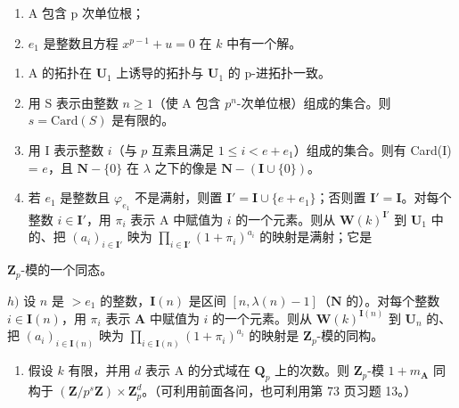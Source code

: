 \begin{enumerate}
\def\labelenumi{(\roman{enumi})}
\item
  A 包含 p 次单位根；
\item
  \(e_1\) 是整数且方程 \(x^{p - 1} + u = 0\) 在 \(k\) 中有一个解。
\end{enumerate}

\begin{enumerate}
\def\labelenumi{\alph{enumi})}
\setcounter{enumi}{3}
\item
  A 的拓扑在 \(\mathbf{U}_1\) 上诱导的拓扑与 \(\mathbf{U}_1\) 的 p-进拓扑一致。
\item
  用 S 表示由整数 \(n \geqslant 1\)（使 A 包含 \(p^n\)-次单位根）组成的集合。则 \(s = \text{Card}(S)\) 是有限的。
\item
  用 I 表示整数 \(i\)（与 \(p\) 互素且满足 \(1 \leqslant i < e + e_1\)）组成的集合。则有 Card(I) = \(e\)，且 \(\mathbf{N} - \{0\}\) 在 \(\lambda\) 之下的像是 \(\mathbf{N} - (\mathbf{I} \cup \{0\})\)。
\item
  若 \(e_1\) 是整数且 \(\varphi_{e_1}\) 不是满射，则置 \(\mathbf{I}' = \mathbf{I} \cup \{e + e_1\}\)；否则置 \(\mathbf{I}' = \mathbf{I}\)。对每个整数 \(i \in \mathbf{I}'\)，用 \(\pi_i\) 表示 A 中赋值为 \(i\) 的一个元素。则从 \(\mathbf{W}(k)^{\mathbf{I}'}\) 到 \(\mathbf{U}_1\) 中的、把 \((a_i)_{i \in \mathbf{I}'}\) 映为 \(\prod_{i \in \mathbf{I}'} (1 + \pi_i)^{a_i}\) 的映射是满射；它是
\end{enumerate}

\(\mathbf{Z}_{p}\)-模的一个同态。

\(h)\) 设 \(n\) 是 \(>e_{1}\) 的整数，\(\mathbf{I}(n)\) 是区间 \([n, \lambda(n) - 1]\)（\(\mathbf{N}\) 的）。对每个整数 \(i \in \mathbf{I}(n)\)，用 \(\pi_{i}\) 表示 \(\mathbf{A}\) 中赋值为 \(i\) 的一个元素。则从 \(\mathbf{W}(k)^{\mathbf{I}(n)}\) 到 \(\mathbf{U}_{n}\) 的、把 \((a_{i})_{i \in \mathbf{I}(n)}\) 映为 \(\prod_{i \in \mathbf{I}(n)} (1 + \pi_{i})^{a_{i}}\) 的映射是 \(\mathbf{Z}_{p}\)-模的同构。

\begin{enumerate}
\def\labelenumi{\roman{enumi})}
\tightlist
\item
  假设 \(k\) 有限，并用 \(d\) 表示 A 的分式域在 \(\mathbf{Q}_{p}\) 上的次数。则 \(\mathbf{Z}_{p}\)-模 \(1 + m_{\mathbf{A}}\) 同构于 \((\mathbf{Z}/p^{s}\mathbf{Z}) \times \mathbf{Z}_{p}^{d}\)。（可利用前面各问，也可利用第 73 页习题 13。）
\end{enumerate}


